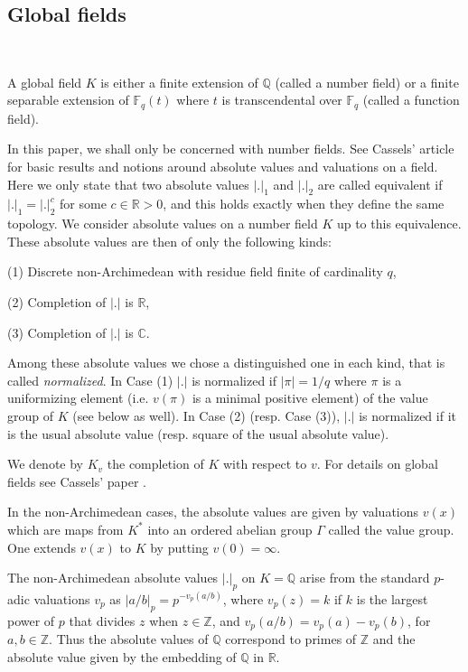\documentclass[12pt]{amsart}
\def\R{\mathbb{R}}
\def\C{\mathbb{C}}
\def\F{\mathbb{F}}
\def\Z{\mathbb{Z}}
\def\C{\mathbb{C}}
\def\R{\mathbb{R}}
\def\Q{\mathbb{Q}}
\def\F{\mathbb{F}}
\numberwithin{equation}{section}
\begin{document}
\medskip

\subsection{\bf Global fields}\label{}

\

\medskip

A global field $K$ is either a finite extension of $\Q$ (called a number field) or a finite separable extension of $\F_q(t)$ where $t$ is transcendental over $\F_q$ (called a function field). 

In this paper, we shall only be concerned with number fields. See Cassels' article \cite{Cassels} for basic results and notions around absolute values and valuations on a field. Here we only state that two absolute values $|.|_1$ and 
$|.|_2$ are called equivalent if $|.|_1=|.|_2^c$ for some $c\in \R>0$, and this holds exactly when they define the same topology. We consider absolute values on a number field $K$ up to this equivalence. These absolute values are then of only the following kinds:

(1) Discrete non-Archimedean with residue field finite of cardinality $q$,

(2) Completion of $|.|$ is $\R$,

(3) Completion of $|.|$ is $\C$.

Among these absolute values we chose a distinguished one in each kind, that is called {\it normalized}.  In Case (1) $|.|$ is normalized if $|\pi|=1/q$ where $\pi$ is a uniformizing element (i.e. $v(\pi)$ is a minimal positive element) of the value group of $K$ (see below as well). In Case (2) (resp. Case (3)), $|.|$ is normalized if it is the usual absolute value (resp. square of the usual absolute value).

We denote by $K_v$ the completion of $K$ with respect to $v$. For details on global fields see Cassels' paper \cite{Cassels}. 

In the non-Archimedean cases, the absolute values are given by valuations $v(x)$ which are maps from $K^*$ into an 
ordered abelian group $\Gamma$ called the value group. One extends $v(x)$ to $K$ by putting $v(0)=\infty$. 

The non-Archimedean absolute values $|.|_p$ on $K=\Q$ arise from the standard $p$-adic valuations $v_p$ as 
$|a/b|_p=p^{-v_p(a/b)}$, where $v_p(z)=k$ if $k$ is the largest power of $p$ that divides $z$ when $z\in \Z$, and 
$v_p(a/b)=v_p(a)-v_p(b)$, for $a,b\in \Z$. Thus the absolute values of $\Q$ correspond to primes of $\Z$ and 
the absolute value given by the embedding of $\Q$ in $\R$.
\end{document}
